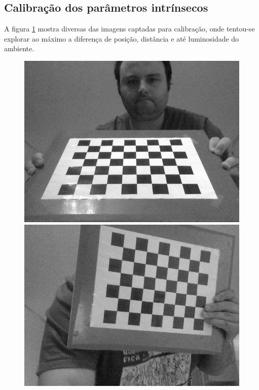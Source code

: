 \documentclass[conference]{IEEEtran}
\begin{document}
\subsection{Calibração dos parâmetros intrínsecos}

A figura \ref{snapshots} mostra diversas das imagens captadas para calibração, onde tentou-se explorar ao máximo a diferença de posição, distância e até luminosidade do ambiente.
\begin{figure}[!htb]\label{snapshots}
  \includegraphics[width=\linewidth]{snap-1.png}
\endminipage\hfill
{}
  \includegraphics[width=\linewidth]{snap-2.png}
\endminipage\hfill
{}%

\end{figure}
\end{document}
